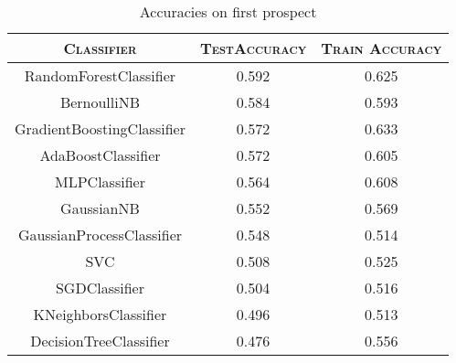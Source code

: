 \documentclass[12pt]{article}
\begin{document}
\begin{table}[H]
    \centering
    \begin{tabular}{ccc}
        \toprule
        \textsc{Classifier}        & \textsc{TestAccuracy} & \textsc{Train Accuracy} \\ \midrule
        RandomForestClassifier     & 0.592                 & 0.625                   \\
        BernoulliNB                & 0.584                 & 0.593                   \\
        GradientBoostingClassifier & 0.572                 & 0.633                   \\
        AdaBoostClassifier         & 0.572                 & 0.605                   \\
        MLPClassifier              & 0.564                 & 0.608                   \\
        GaussianNB                 & 0.552                 & 0.569                   \\
        GaussianProcessClassifier  & 0.548                 & 0.514                   \\
        SVC                        & 0.508                 & 0.525                   \\
        SGDClassifier              & 0.504                 & 0.516                   \\
        KNeighborsClassifier       & 0.496                 & 0.513                   \\
        DecisionTreeClassifier     & 0.476                 & 0.556                   \\
        \bottomrule
    \end{tabular}
    \caption{Accuracies on first prospect}
    \label{table: all algorithms and accuracies}
\end{table}
\end{document}
